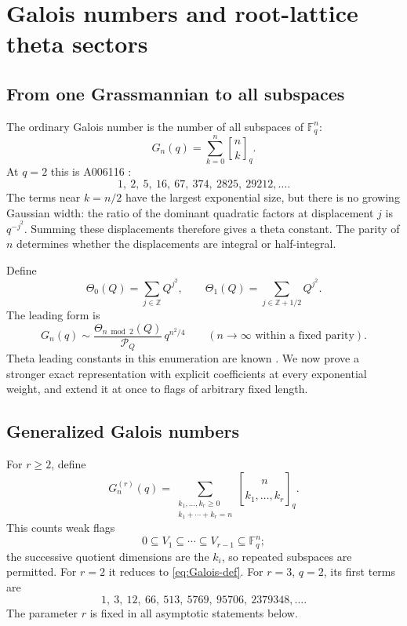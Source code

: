 \documentclass[11pt]{article}
\numberwithin{equation}{section}
\theoremstyle{definition}
\newcommand{\Z}{\mathbb Z}
\newcommand{\F}{\mathbb F}
\newcommand{\qbin}[2]{\genfrac{[}{]}{0pt}{}{#1}{#2}_{q}}
\newcommand{\Pinf}{\mathcal P_Q}
\newcommand{\T}{\Theta}
\begin{document}
\section{Galois numbers and root-lattice theta sectors}
\label{sec:galois}

\subsection{From one Grassmannian to all subspaces}

The ordinary Galois number is the number of all subspaces of $\F_q^n$:
\begin{equation}\label{eq:Galois-def}
 G_n(q)=\sum_{k=0}^n\qbin{n}{k}.
\end{equation}
At $q=2$ this is A006116 \cite{oeisGalois}:
\[
 1,\ 2,\ 5,\ 16,\ 67,\ 374,\ 2825,\ 29212,\ldots.
\]
The terms near $k=n/2$ have the largest exponential size, but there is no growing Gaussian width: the ratio of the dominant quadratic factors at displacement $j$ is $q^{-j^2}$. Summing these displacements therefore gives a theta constant. The parity of $n$ determines whether the displacements are integral or half-integral.

Define
\begin{equation}\label{eq:theta2}
 \T_0(Q)=\sum_{j\in\Z}Q^{j^2},\qquad
 \T_1(Q)=\sum_{j\in\Z+1/2}Q^{j^2}.
\end{equation}
The leading form is
\begin{equation}\label{eq:Galois-leading}
 G_n(q)\sim\frac{\T_{n\bmod2}(Q)}{\Pinf}\,q^{n^2/4}
 \qquad(n\to\infty\text{ within a fixed parity}).
\end{equation}
Theta leading constants in this enumeration are known \cite{kousidis}. We now prove a stronger exact representation with explicit coefficients at every exponential weight, and extend it at once to flags of arbitrary fixed length.

\subsection{Generalized Galois numbers}

For $r\ge2$, define
\begin{equation}\label{eq:generalGalois-def}
 G_n^{(r)}(q)=\sum_{\substack{k_1,\ldots,k_r\ge0\\k_1+\cdots+k_r=n}}
 \genfrac{[}{]}{0pt}{}{n}{k_1,\ldots,k_r}_q.
\end{equation}
This counts weak flags
\[
 0\subseteq V_1\subseteq\cdots\subseteq V_{r-1}\subseteq\F_q^n;
\]
the successive quotient dimensions are the $k_i$, so repeated subspaces are permitted. For $r=2$ it reduces to \eqref{eq:Galois-def}. For $r=3$, $q=2$, its first terms are
\[
 1,\ 3,\ 12,\ 66,\ 513,\ 5769,\ 95706,\ 2379348,\ldots.
\]
The parameter $r$ is fixed in all asymptotic statements below.
\end{document}
